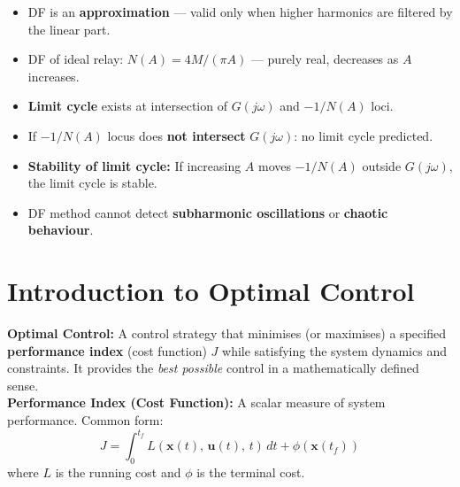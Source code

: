 \documentclass[12pt,a4paper]{article}
\begin{document}
\begin{tcolorbox}[exambox, title={Exam Tips --- Describing Function}]
\begin{itemize}[leftmargin=*, itemsep=3pt, topsep=0pt]
  \item DF is an \textbf{approximation} --- valid only when higher harmonics are filtered by the linear part.
  \item DF of ideal relay: $N(A) = 4M/(\pi A)$ --- purely real, decreases as $A$ increases.
  \item \textbf{Limit cycle} exists at intersection of $G(j\omega)$ and $-1/N(A)$ loci.
  \item If $-1/N(A)$ locus does \textbf{not intersect} $G(j\omega)$: no limit cycle predicted.
  \item \textbf{Stability of limit cycle:} If increasing $A$ moves $-1/N(A)$ outside $G(j\omega)$, the limit cycle is stable.
  \item DF method cannot detect \textbf{subharmonic oscillations} or \textbf{chaotic behaviour}.
\end{itemize}
\end{tcolorbox}

\section{Introduction to Optimal Control}

\begin{tcolorbox}[defbox]
\textbf{Optimal Control:} A control strategy that minimises (or maximises) a specified \textbf{performance index} (cost function) $J$ while satisfying the system dynamics and constraints. It provides the \textit{best possible} control in a mathematically defined sense.\\[4pt]
\textbf{Performance Index (Cost Function):} A scalar measure of system performance. Common form:
$$J = \int_0^{t_f} L(\mathbf{x}(t),\, \mathbf{u}(t),\, t)\, dt + \phi(\mathbf{x}(t_f))$$
where $L$ is the running cost and $\phi$ is the terminal cost.
\end{tcolorbox}
\end{document}
